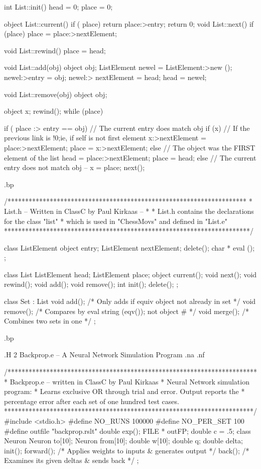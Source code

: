 int List::init()
{ head = 0;
  place = 0;
}


object List::current()
{ if ( place) return place:>entry;
  return 0;
}
void List::next()
{ if (place)
    place = place:>nextElement; }

void List::rewind() {place =  head; }

void List::add(obj) object obj;
{ ListElement newel = ListElement:>new ();
  newel:>entry = obj;
  newel:> nextElement = head;
  head = newel;
}

void List::remove(obj) object obj;
{
  object x;
  rewind();
  while (place)
  {  if (  place :> entry == obj) // The current entry does match obj
        { if (x) // If the previous link is !0;ie, if self is not first element
            { x:>nextElement =  place:>nextElement;
                place = x:>nextElement;
            }
          else  // The object was the FIRST element of the list
            {   head =  place:>nextElement;
               place =   head;
            }
         }
      else  // The current entry does not match obj --
         { x =  place;
             next();
          }

    }
}

.bp


/********************************************************************
 *        List.h -- Written in ClassC by Paul Kirkaas --
 *
 *        List.h contains the declarations for the class "list"
 *        which is used in "ChessMovs" and defined in "List.e"
 **********************************************************************/


class ListElement
{ object entry;
  ListElement nextElement;
  delete();
  char * eval ();
};

class List
{ ListElement head;
  ListElement place;
  object current();
  void next();
  void rewind();
  void add();
  void remove();
  int init();
  delete();
};

class Set : List
{ void add();        /* Only adds if equiv object not already in set */
  void remove(); /* Compares by eval string (eqv()); not object # */
  void merge();  /* Combines two sets in one */
};

.bp

.H 2 Backprop.e -- A Neural Network Simulation Program
.na
.nf

/***********************************************************************
 *        Backprop.e -- written in ClassC by Paul Kirkaas
 *        Neural Network simulation program:
 *        Learns exclusive OR through trial and error.  Output reports the
 *        percentage error after each set of one hundred test cases.
 ***********************************************************************/
#include <stdio.h>
#define NO_RUNS 100000
#define NO_PER_SET 100
#define outfile "backprop.rslt"
double exp();
FILE * outFP;
double c = .5;
class Neuron
{
  Neuron to[10];
  Neuron from[10];
  double w[10];
  double q;
  double delta;
  init();
  forward();  /* Applies weights to inputs & generates output */
  back();     /* Examines its given deltas & sends back */
};

